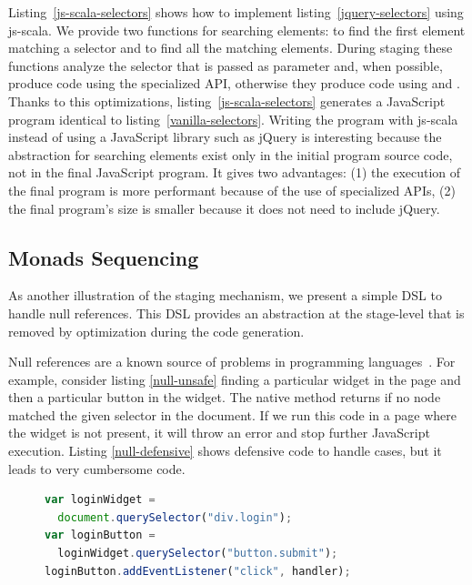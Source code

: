 \documentclass[preprint]{sigplanconf}
\begin{document}
Listing~\ref{js-scala-selectors} shows how to implement listing~\ref{jquery-selectors} using js-scala. We provide two
functions for searching elements:  to find the first element matching a selector and  to
find all the matching elements. During staging these functions analyze the selector that is passed as parameter and,
when possible, produce code using the specialized API, otherwise they produce code using  and
. Thanks to this optimizations, listing~\ref{js-scala-selectors} generates a JavaScript
program identical to listing~\ref{vanilla-selectors}. Writing the program with js-scala instead of using a JavaScript
library such as jQuery is interesting because the abstraction for searching elements exist only in the initial
program source code, not in the final JavaScript program. It gives two advantages: (1) the execution of the final
program is more performant because of the use of specialized APIs, (2) the final program’s size is smaller because it
does not need to include jQuery.

\subsection{Monads Sequencing}

As another illustration of the staging mechanism, we present a simple DSL to handle null references. This DSL
provides an abstraction at the stage-level that is removed by optimization during the code generation.

Null references are a known source of problems in programming languages~\cite{Hoare09_Null,Nanda09_Null}. For
example, consider listing \ref{null-unsafe} finding a particular widget in the page and then a particular
button in the widget. The native  method returns  if no node matched the given
selector in the document. If we run this code in a page where the widget is not present, it will throw an error
and stop further JavaScript execution. Listing \ref{null-defensive} shows defensive code to handle 
cases, but it leads to very cumbersome code.


\begin{figure}
\begin{lstlisting}[language=JavaScript,label=null-unsafe,caption=Unsafe code]
var loginWidget =
  document.querySelector("div.login");
var loginButton =
  loginWidget.querySelector("button.submit");
loginButton.addEventListener("click", handler);
\end{lstlisting}
\end{figure}
\end{document}
